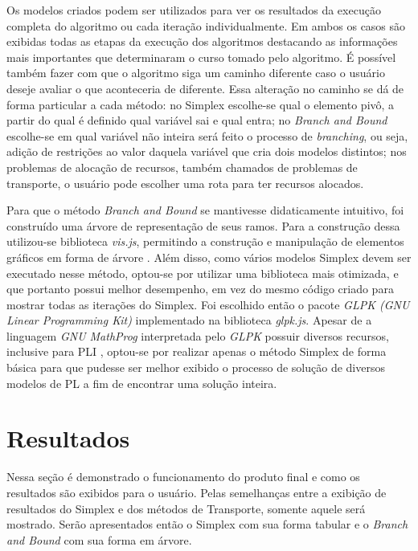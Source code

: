 \documentclass [11pt]{articleSBPO}
\begin{document}
Os modelos criados podem ser utilizados para ver os resultados da execução completa do algoritmo ou cada iteração individualmente. Em ambos os casos são exibidas todas as etapas da execução dos algoritmos destacando as informações mais importantes que determinaram o curso tomado pelo algoritmo. É possível também fazer com que o algoritmo siga um caminho diferente caso o usuário deseje avaliar o que aconteceria de diferente. Essa alteração no caminho se dá de forma particular a cada método: no Simplex escolhe-se qual o elemento pivô, a partir do qual é definido qual variável sai e qual entra; no \textit{Branch and Bound} escolhe-se em qual variável não inteira será feito o processo de \textit{branching}, ou seja, adição de restrições ao valor daquela variável que cria dois modelos distintos; nos problemas de alocação de recursos, também chamados de problemas de transporte, o usuário pode escolher uma rota para ter recursos alocados.

Para que o método \textit{Branch and Bound} se mantivesse didaticamente intuitivo, foi construído uma árvore de representação de seus ramos. Para a construção dessa utilizou-se biblioteca \textit{vis.js}, permitindo a construção e manipulação de elementos gráficos em forma de árvore \cite{vis}. Além disso, como vários modelos Simplex devem ser executado nesse método, optou-se por utilizar uma biblioteca mais otimizada, e que portanto possui melhor desempenho, em vez do mesmo código criado para mostrar todas as iterações do Simplex. Foi escolhido então o pacote \textit{GLPK (GNU Linear Programming Kit)} implementado na biblioteca \textit{glpk.js}. Apesar de a linguagem \textit{GNU MathProg} interpretada pelo \textit{GLPK} possuir diversos recursos, inclusive para PLI \cite{mathprog}, optou-se por realizar apenas o método Simplex de forma básica para que pudesse ser melhor exibido o processo de solução de diversos modelos de PL a fim de encontrar uma solução inteira.

\section{Resultados}\label{sec:resultados}

Nessa seção é demonstrado o funcionamento do produto final e como os resultados são exibidos para o usuário. Pelas semelhanças entre a exibição de resultados do Simplex e dos métodos de Transporte, somente aquele será mostrado. Serão apresentados então o Simplex com sua forma tabular e o \textit{Branch and Bound} com sua forma em árvore.
\end{document}
